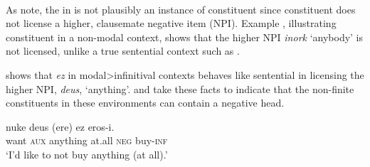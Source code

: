 \documentclass[output=paper]{langscibook}
\begin{document}
\ea	\label{ex:haddican:26} 
     \citep{etxepare-uribeetxebarria2009}\\
\z\z

As \cite{etxepare-uribeetxebarria2009} note, the  in  is not plausibly an instance of constituent  since constituent  does not license a higher, clausemate negative  item (NPI).  Example , illustrating constituent  in a non-modal context, shows that the higher NPI \textit{inork} `anybody' is not licensed, unlike a true sentential  context such as .  

\ea	
{}
\z\z
 
 shows that \textit{ez} in mo\-dal>in\-fin\-i\-ti\-val contexts behaves like sentential  in licensing the higher NPI, \textit{deus}, `anything'.  \cite{balza2010} and \cite{etxepare-uribeetxebarria2009} take these facts to indicate that the non-finite constituents in these environments can contain a negative head.
 
\ea\label{ex:haddican:28}
  {nuke} {deus} {(ere)} {ez} {eros-i.}\\
     want \textsc{aux}   anything at.all \textsc{neg} buy-\textsc{inf} \\
\glt	`I'd like to not buy anything (at all).'
\z
 
\end{document}

